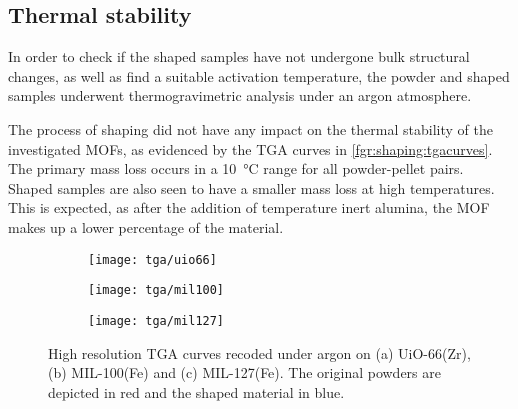 
\subsection{Thermal stability}

In order to check if the shaped samples have not undergone bulk
structural changes, as well as find a suitable activation temperature,
the powder and shaped samples underwent thermogravimetric analysis
under an argon atmosphere.

The process of shaping did not have any impact on the thermal stability of
the investigated MOFs, as evidenced by the TGA curves in
\autoref{fgr:shaping:tgacurves}. The primary mass loss occurs
in a \SI{10}{\degreeCelsius} range for all powder-pellet pairs.
Shaped samples are also seen to have a smaller mass loss
at high temperatures. This is expected, as after the addition of
temperature inert alumina, the MOF makes up a lower percentage of
the material.

\begin{figure}
	\centering
	\begin{subfigure}{0.85\textwidth}
		\parbox[c]{0.1\linewidth}{\caption{}\label{fgr:shaping:tgauio66}}%
		\parbox[b]{0.7\linewidth}{%
			\texttt{[image: tga/uio66]}%
		}%
	\end{subfigure}
	\begin{subfigure}{0.85\textwidth}
		\parbox[c]{0.1\linewidth}{\caption{}\label{fgr:shaping:tgamil100}}%
		\parbox[b]{0.7\linewidth}{%
			\texttt{[image: tga/mil100]}%
		}%
	\end{subfigure}
	\begin{subfigure}{0.85\textwidth}
		\parbox[c]{0.1\linewidth}{\caption{}\label{fgr:shaping:tgamil127}}%
		\parbox[b]{0.7\linewidth}{%
			\texttt{[image: tga/mil127]}%
		}%
	\end{subfigure}

	\caption{High resolution TGA curves recoded under argon
		on (a) UiO-66(Zr), (b) MIL-100(Fe) and (c) MIL-127(Fe). The
		original powders are depicted in red and the shaped material
		in blue.}%
	\label{fgr:shaping:tgacurves}

\end{figure}
